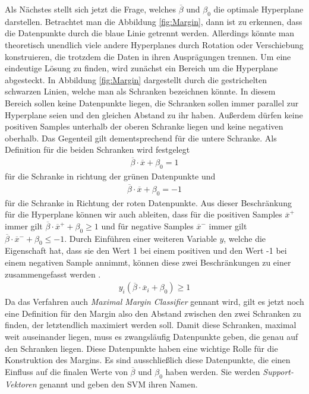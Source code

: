 \documentclass[
]{article}
\begin{document}
Als Nächstes stellt sich jetzt die Frage, welches \(\overline{\beta}\)
und \(\beta_0\) die optimale Hyperplane darstellen. Betrachtet man die
Abbildung \ref{fig:Margin}, dann ist zu erkennen, dass die Datenpunkte
durch die blaue Linie getrennt werden. Allerdings könnte man theoretisch
unendlich viele andere Hyperplanes durch Rotation oder Verschiebung
konstruieren, die trotzdem die Daten in ihren Ausprägungen trennen. Um
eine eindeutige Lösung zu finden, wird zunächst ein Bereich um die
Hyperplane abgesteckt. In Abbildung \ref{fig:Margin} dargestellt durch
die gestrichelten schwarzen Linien, welche man als Schranken bezeichnen
könnte. In diesem Bereich sollen keine Datenpunkte liegen, die Schranken
sollen immer parallel zur Hyperplane seien und den gleichen Abstand zu
ihr haben. Außerdem dürfen keine positiven Samples unterhalb der oberen
Schranke liegen und keine negativen oberhalb. Das Gegenteil gilt
dementsprechend für die untere Schranke. Als Definition für die beiden
Schranken wird festgelegt \begin{align}
\overline{\beta}\cdot \overline{x}+\beta_0=1\label{eq:posSV}
\end{align} für die Schranke in richtung der grünen Datenpunkte und
\begin{align}
\overline{\beta}\cdot \overline{x}+\beta_0=-1\label{eq:negSV}
\end{align} für die Schranke in Richtung der roten Datenpunkte. Aus
dieser Beschränkung für die Hyperplane können wir auch ableiten, dass
für die positiven Samples \(\overline{x}^+\) immer gilt
\(\overline{\beta}\cdot \overline{x}^++\beta_0\ge 1\) und für negative
Samples \(\overline{x}^-\) immer gilt
\(\overline{\beta}\cdot \overline{x}^-+\beta_0\le -1\). Durch Einführen
einer weiteren Variable \(y\), welche die Eigenschaft hat, dass sie den
Wert 1 bei einem positiven und den Wert -1 bei einem negativen Sample
annimmt, können diese zwei Beschränkungen zu einer zusammengefasst
werden \parencite{cortesSupportvectorNetworks1995}. \begin{align}
y_i(\overline{\beta}\cdot \overline{x}_i+\beta_0)\ge 1\label{eq:Nebenbedingung}
\end{align} Da das Verfahren auch \textit{Maximal Margin Classifier}
gennant wird, gilt es jetzt noch eine Definition für den Margin also den
Abstand zwischen den zwei Schranken zu finden, der letztendlich
maximiert werden soll. Damit diese Schranken, maximal weit auseinander
liegen, muss es zwangsläufig Datenpunkte geben, die genau auf den
Schranken liegen. Diese Datenpunkte haben eine wichtige Rolle für die
Konstruktion des Margins. Es sind ausschließlich diese Datenpunkte, die
einen Einfluss auf die finalen Werte von \(\overline{\beta}\) und
\(\beta_0\) haben werden. Sie werden \textit{Support-Vektoren} genannt
und geben den SVM ihren Namen.
\end{document}
